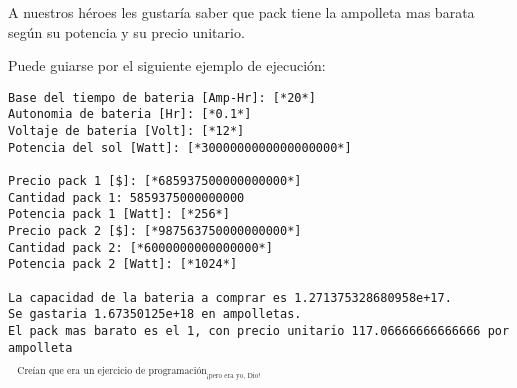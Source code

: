 A nuestros héroes les gustaría saber que pack tiene la ampolleta mas barata según su potencia y su precio unitario.

Puede guiarse por el siguiente ejemplo de ejecución:

\begin{lstlisting}[style=consola]
Base del tiempo de bateria [Amp-Hr]: [*20*]
Autonomia de bateria [Hr]: [*0.1*]
Voltaje de bateria [Volt]: [*12*]
Potencia del sol [Watt]: [*3000000000000000000*]

Precio pack 1 [$]: [*685937500000000000*]
Cantidad pack 1: 5859375000000000
Potencia pack 1 [Watt]: [*256*]
Precio pack 2 [$]: [*987563750000000000*]
Cantidad pack 2: [*6000000000000000*]
Potencia pack 2 [Watt]: [*1024*]

La capacidad de la bateria a comprar es 1.271375328680958e+17.
Se gastaria 1.67350125e+18 en ampolletas.
El pack mas barato es el 1, con precio unitario 117.06666666666666 por ampolleta
\end{lstlisting}

${\text{ }}_{\text{Creían que era un ejercicio de programación}_{\text{¡pero era yo, Dio!}}}$


